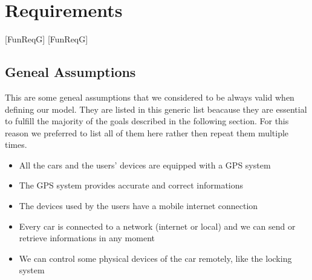\pagebreak
\section{Requirements}
\label{sec:req}

[FunReqG]
[FunReqG]

\newenvironment{Goal}[2]{
    \refstepcounter{FunReqG}
    \paragraph{Goal \arabic{FunReqG}:} #2.
    \label{goal:#1}
    \begin{itemize}
}{\end{itemize}}

\newcommand{\Req}[1]{
    \stepcounter{FunReqR}
    \item[] \textbf{Requirement \arabic{FunReqR}}: #1.
}

\newcommand{\Dom}[1]{
    \stepcounter{FunReqD}
    \item[] \textbf{Domain Assumption \arabic{FunReqD}}: #1.
}

\subsection{Geneal Assumptions}
This are some geneal assumptions that we considered to be always valid when defining our model.
They are listed in this generic list beacause they are essential to fulfill the majority
of the goals described in the following section. For this reason we preferred to list all
of them here rather then repeat them multiple times.

\begin{itemize}
    \item{All the cars and the users' devices are equipped with a GPS system}
    \item{The GPS system provides accurate and correct informations}
    \item{The devices used by the users have a mobile internet connection}
    \item{Every car is connected to a network (internet or local)
            and we can send or retrieve informations in any moment}
    \item{We can control some physical devices of the car remotely, like the locking system}
\end{itemize}

